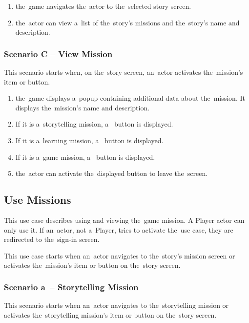 \begin{enumerate}
    \item the~game navigates the~actor to the~selected story screen.
    \item the~actor can view a~list of the~story's missions and the~story's name and description.
\end{enumerate}

\subsubsection*{Scenario C -- View Mission}

This scenario starts when, on the~story screen, an~actor activates the~mission's item or button.

\begin{enumerate}
    \item the~game displays a~popup containing additional data about the~mission.
    It displays the~mission's name and description.
    \item If it is a~storytelling mission, a~ button is displayed.
    \item If it is a~learning mission, a~ button is displayed.
    \item If it is a~game mission, a~ button is displayed.
    \item the~actor can activate the~displayed button to leave the~screen.
\end{enumerate}

\pagebreak
\subsection{Use Missions}

This use case describes using and viewing the~game mission.
A Player actor can only use it.
If an~actor, not a~Player, tries to activate the~use case, they are redirected to the~sign-in screen.

This use case starts when an~actor navigates to the~story's mission screen or activates the~mission's item or button on the~story screen.

\subsubsection*{Scenario a~-- Storytelling Mission}

This scenario starts when an~actor navigates to the~storytelling mission or activates the~storytelling mission's item or button on the~story screen.

